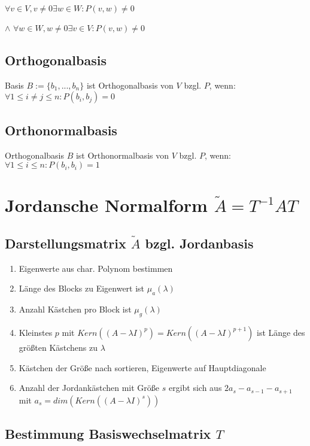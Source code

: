\hspace*{2mm}
$\forall v \in V, v \neq 0 \exists w \in W : P(v, w) \neq 0$

$\land$ $\forall w \in W, w \neq 0 \exists v \in V : P(v, w) \neq 0$

\subsection*{Orthogonalbasis}

Basis $B := \{b_1, ..., b_n\}$ ist Orthogonalbasis von $V$ bzgl. $P$, wenn: $\forall 1 \leq i \neq j \leq n : P(b_i, b_j) = 0$

\subsection*{Orthonormalbasis}

Orthogonalbasis $B$ ist Orthonormalbasis von $V$ bzgl. $P$, wenn: $\forall 1 \leq i \leq n : P(b_i, b_i) = 1$

\section*{Jordansche Normalform $\tilde A = T^{-1} A T$}

\subsection*{Darstellungsmatrix $\tilde A$ bzgl. Jordanbasis}

\begin{enumerate}[leftmargin=4mm]
	\item Eigenwerte aus char. Polynom bestimmen
	\item Länge des Blocks zu Eigenwert ist $\mu_a(\lambda)$
	\item Anzahl Kästchen pro Block ist $\mu_g(\lambda)$
	\item Kleinstes $p$ mit $Kern((A-\lambda I)^p) = Kern((A-\lambda I)^{p+1})$ ist Länge des größten Kästchens zu $\lambda$
	\item Kästchen der Größe nach sortieren, Eigenwerte auf Hauptdiagonale
	\item Anzahl der Jordankästchen mit Größe $s$ ergibt sich aus $2a_s - a_{s-1} - a_{s+1}$ mit $a_s = dim(Kern((A-\lambda I)^s))$
\end{enumerate}

\subsection*{Bestimmung Basiswechselmatrix $T$}

